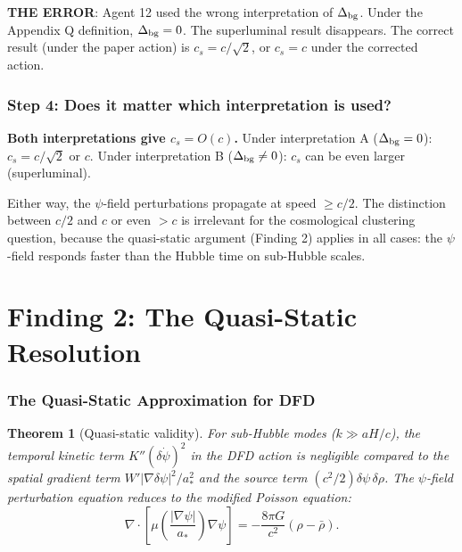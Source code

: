 \documentclass[11pt]{article}
\newtheorem{theorem}{Theorem}
\begin{document}
\textbf{THE ERROR}: Agent 12 used the wrong interpretation of $\Delta_{\rm bg}$.
Under the Appendix Q definition, $\Delta_{\rm bg} = 0$. The superluminal
result disappears. The correct result (under the paper action) is
$c_s = c/\sqrt{2}$, or $c_s = c$ under the corrected action.

\section{Step 4: Does it matter which interpretation is used?}

\textbf{Both interpretations give $c_s = O(c)$.} Under interpretation A
($\Delta_{\rm bg} = 0$): $c_s = c/\sqrt{2}$ or $c$. Under interpretation B
($\Delta_{\rm bg} \neq 0$): $c_s$ can be even larger (superluminal).

Either way, the $\psi$-field perturbations propagate at speed $\geq c/2$.
The distinction between $c/2$ and $c$ or even $> c$ is irrelevant for
the cosmological clustering question, because the quasi-static argument
(Finding 2) applies in all cases: the $\psi$-field responds faster than
the Hubble time on sub-Hubble scales.


\part{Finding 2: The Quasi-Static Resolution}
\label{part:quasistatic}

\section{The Quasi-Static Approximation for DFD}

\begin{theorem}[Quasi-static validity]\label{thm:quasistatic}
For sub-Hubble modes ($k \gg aH/c$), the temporal kinetic term
$K''(\delta\dot\psi)^2$ in the DFD action is negligible compared
to the spatial gradient term $W'|\nabla\delta\psi|^2/a_*^2$ and
the source term $(c^2/2)\delta\psi\,\delta\rho$. The $\psi$-field
perturbation equation reduces to the modified Poisson equation:
\begin{equation}
\nabla\cdot\!\left[\mu\!\left(\frac{|\nabla\psi|}{a_*}\right)
\nabla\psi\right] = -\frac{8\pi G}{c^2}(\rho - \bar\rho).
\end{equation}
\end{theorem}
\end{document}
